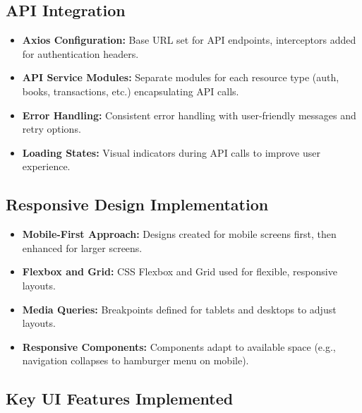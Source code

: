 \documentclass[12pt,a4paper]{report}
\begin{document}
\subsection{API Integration}

\begin{itemize}
    \item \textbf{Axios Configuration:} Base URL set for API endpoints, interceptors added for authentication headers.
    
    \item \textbf{API Service Modules:} Separate modules for each resource type (auth, books, transactions, etc.) encapsulating API calls.
    
    \item \textbf{Error Handling:} Consistent error handling with user-friendly messages and retry options.
    
    \item \textbf{Loading States:} Visual indicators during API calls to improve user experience.
\end{itemize}

\subsection{Responsive Design Implementation}

\begin{itemize}
    \item \textbf{Mobile-First Approach:} Designs created for mobile screens first, then enhanced for larger screens.
    
    \item \textbf{Flexbox and Grid:} CSS Flexbox and Grid used for flexible, responsive layouts.
    
    \item \textbf{Media Queries:} Breakpoints defined for tablets and desktops to adjust layouts.
    
    \item \textbf{Responsive Components:} Components adapt to available space (e.g., navigation collapses to hamburger menu on mobile).
\end{itemize}

\subsection{Key UI Features Implemented}
\end{document}
